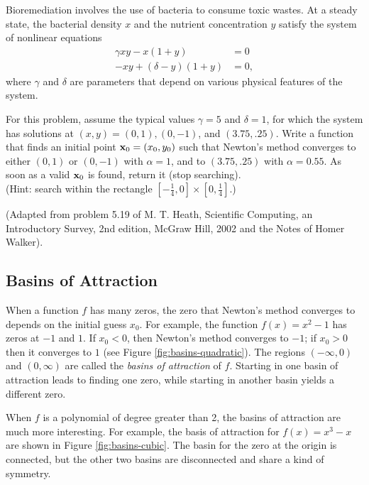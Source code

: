 \begin{problem}
Bioremediation involves the use of bacteria to consume toxic wastes.
At a steady state, the bacterial density $x$ and the nutrient concentration $y$ satisfy the system of nonlinear equations
\begin{align*}
\gamma xy - x(1 + y) &= 0 \\
-xy + (\delta - y)(1 + y) &= 0,
\end{align*}
where $\gamma$ and $\delta$ are parameters that depend on various physical features of the system.

For this problem, assume the typical values $\gamma = 5$ and $\delta = 1$, for which the system has solutions at $(x, y) = (0, 1), (0, -1)$, and $(3.75, .25)$.
Write a function that finds an initial point $\mathbf{x}_0 = (x_0,y_0)$ such that Newton's method converges to either $(0, 1)$ or $(0, -1)$ with $\alpha = 1$, and to $(3.75, .25)$ with $\alpha = 0.55$.
As soon as a valid $\mathbf{x}_0$ is found, return it (stop searching).
\\(Hint: search within the rectangle $[-\frac{1}{4},0]\times[0,\frac{1}{4}]$.)

(Adapted from problem 5.19 of M. T. Heath, Scientific Computing, an Introductory Survey, 2nd edition, McGraw Hill, 2002 and the Notes of Homer Walker). %
\end{problem}

\subsection*{Basins of Attraction} %

When a function $f$ has many zeros, the zero that Newton's method converges to depends on the initial guess $x_0$.
For example, the function $f(x)=x^2-1$ has zeros at $-1$ and $1$.
If $x_0<0$, then Newton's method converges to $-1$; if $x_0 > 0$ then it converges to $1$ (see Figure \ref{fig:basins-quadratic}).
The regions $(-\infty, 0)$ and $(0, \infty)$ are called the \emph{basins of attraction} of $f$.
Starting in one basin of attraction leads to finding one zero, while starting in another basin yields a different zero.

When $f$ is a polynomial of degree greater than 2, the basins of attraction are much more interesting.
For example, the basis of attraction for $f(x) = x^3-x$ are shown in Figure \ref{fig:basins-cubic}.
The basin for the zero at the origin is connected, but the other two basins are disconnected and share a kind of symmetry.


